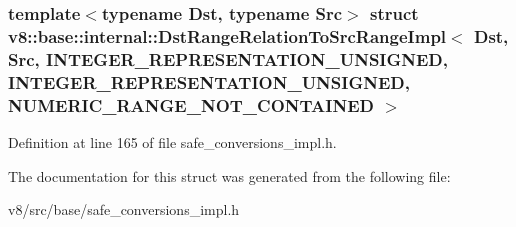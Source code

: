 \subsubsection*{template$<$typename Dst, typename Src$>$\newline
struct v8\+::base\+::internal\+::\+Dst\+Range\+Relation\+To\+Src\+Range\+Impl$<$ Dst, Src, I\+N\+T\+E\+G\+E\+R\+\_\+\+R\+E\+P\+R\+E\+S\+E\+N\+T\+A\+T\+I\+O\+N\+\_\+\+U\+N\+S\+I\+G\+N\+E\+D, I\+N\+T\+E\+G\+E\+R\+\_\+\+R\+E\+P\+R\+E\+S\+E\+N\+T\+A\+T\+I\+O\+N\+\_\+\+U\+N\+S\+I\+G\+N\+E\+D, N\+U\+M\+E\+R\+I\+C\+\_\+\+R\+A\+N\+G\+E\+\_\+\+N\+O\+T\+\_\+\+C\+O\+N\+T\+A\+I\+N\+E\+D $>$}



Definition at line 165 of file safe\+\_\+conversions\+\_\+impl.\+h.



The documentation for this struct was generated from the following file\+:\begin{DoxyCompactItemize}
\item 
v8/src/base/safe\+\_\+conversions\+\_\+impl.\+h\end{DoxyCompactItemize}
